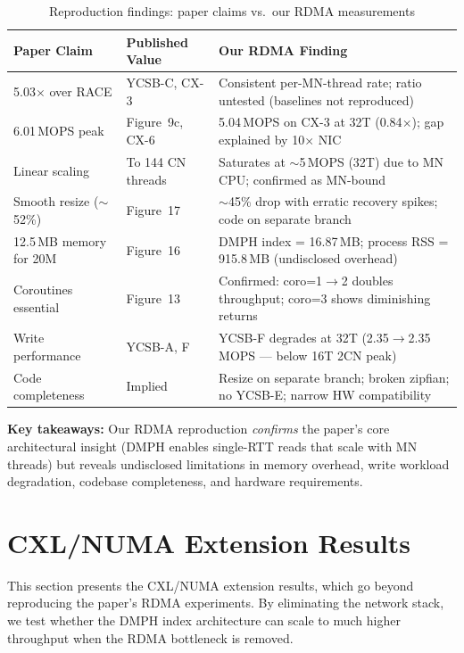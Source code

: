 \documentclass[conference]{IEEEtran}
\begin{document}
\begin{table}[H]
\centering
\caption{Reproduction findings: paper claims vs.\ our RDMA measurements}
\label{tab:repro-summary}
\small
\begin{tabular}{@{}p{3.0cm}p{3.5cm}p{6cm}@{}}
\toprule
\textbf{Paper Claim} & \textbf{Published Value} & \textbf{Our RDMA Finding} \\
\midrule
5.03$\times$ over RACE & YCSB-C, CX-3 & Consistent per-MN-thread rate; ratio untested (baselines not reproduced) \\
6.01\,MOPS peak & Figure~9c, CX-6 & 5.04\,MOPS on CX-3 at 32T (0.84$\times$); gap explained by 10$\times$ NIC \\
Linear scaling & To 144 CN threads & Saturates at $\sim$5\,MOPS (32T) due to MN CPU; confirmed as MN-bound \\
Smooth resize ($\sim$52\%) & Figure~17 & $\sim$45\% drop with erratic recovery spikes; code on separate branch \\
12.5\,MB memory for 20M & Figure~16 & DMPH index = 16.87\,MB; process RSS = 915.8\,MB (undisclosed overhead) \\
Coroutines essential & Figure~13 & Confirmed: coro=1$\to$2 doubles throughput; coro=3 shows diminishing returns \\
Write performance & YCSB-A, F & YCSB-F degrades at 32T (2.35$\to$2.35\,MOPS --- below 16T 2CN peak) \\
Code completeness & Implied & Resize on separate branch; broken zipfian; no YCSB-E; narrow HW compatibility \\
\bottomrule
\end{tabular}
\end{table}

\textbf{Key takeaways:} Our RDMA reproduction \emph{confirms} the paper's core architectural insight (DMPH enables single-RTT reads that scale with MN threads) but reveals undisclosed limitations in memory overhead, write workload degradation, codebase completeness, and hardware requirements.

\section{CXL/NUMA Extension Results}

This section presents the CXL/NUMA extension results, which go beyond reproducing the paper's RDMA experiments. By eliminating the network stack, we test whether the DMPH index architecture can scale to much higher throughput when the RDMA bottleneck is removed.
\end{document}
